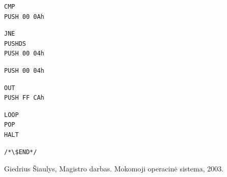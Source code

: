 \documentclass{scrartcl}
\begin{document}
            \begin{lstlisting}[firstnumber = 41]
CMP
PUSH 00 0Ah
            \end{lstlisting}
            \begin{lstlisting}[firstnumber = 45]
JNE
PUSHDS
PUSH 00 04h
            \end{lstlisting}
            \begin{lstlisting}[firstnumber = 50]
PUSH 00 04h
            \end{lstlisting}
            \begin{lstlisting}[firstnumber = 53]
OUT
PUSH FF CAh
            \end{lstlisting}
            \begin{lstlisting}[firstnumber = 57]
LOOP
POP
HALT
        \end{lstlisting}
        \lstset{belowskip = 0.0mm, numbers = none}
        \begin{lstlisting}
/*\$END*/
        \end{lstlisting}
        \begin{thebibliography}{999}
            \bibitem{}
                Giedrius Šiaulys,
                Magistro darbas. Mokomoji operacinė sistema,
                2003.
        \end{thebibliography}
    
\end{document}

